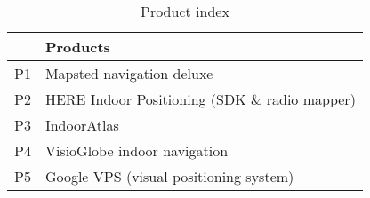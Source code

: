 \setlength{\tabcolsep}{0.5em} %
\renewcommand{\arraystretch}{2} %
\begin{table}[ht!]
	\caption{Product index}
	\label{tab:productstolink}
	\begin{tabular}{|l|l|}
		\hline
		& Products \\ \hline
		P1 & Mapsted navigation deluxe \\ \hline
		P2 & HERE Indoor Positioning (SDK \& radio mapper) \\ \hline
		P3 & IndoorAtlas \\ \hline
		P4 & VisioGlobe indoor navigation \\ \hline
		P5 & Google VPS (visual positioning system) \\ \hline
	\end{tabular}%
\end{table}
